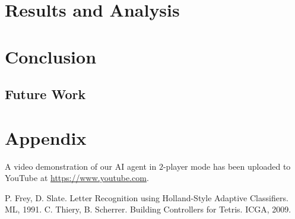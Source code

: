 \documentclass[12pt]{IEEEtran}
\begin{document}
\section{Results and Analysis}

\section{Conclusion}

\subsection{Future Work}

\section{Appendix}
A video demonstration of our AI agent in $2$-player mode has been uploaded to YouTube at \href{https://www.youtube.com}{https://www.youtube.com}.



\begin{thebibliography}{1}
 P. Frey, D. Slate. Letter Recognition using Holland-Style Adaptive Classifiers. ML, 1991.
 C. Thiery, B. Scherrer. Building Controllers for Tetris. ICGA, 2009.
\end{thebibliography}
\end{document}
